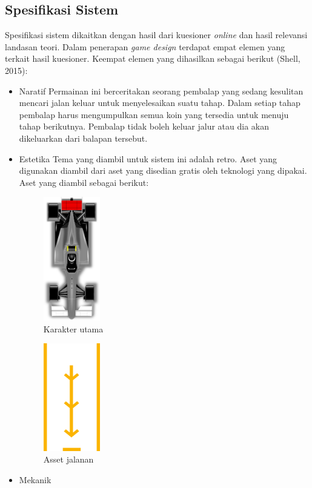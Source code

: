 	\subsection{Spesifikasi Sistem}
		Spesifikasi sistem dikaitkan dengan hasil dari kuesioner \textit{online} dan hasil relevansi landasan teori. Dalam penerapan \textit{game design} terdapat empat elemen yang terkait hasil kuesioner. Keempat elemen yang dihasilkan sebagai berikut (Shell, 2015):
		\begin{itemize}
			\item Naratif
				\subitem Permainan ini berceritakan seorang pembalap yang sedang kesulitan mencari jalan keluar untuk menyelesaikan suatu tahap. Dalam setiap tahap pembalap harus mengumpulkan semua koin yang tersedia untuk menuju tahap berikutnya. Pembalap tidak boleh keluar jalur atau dia akan dikeluarkan dari balapan tersebut.
			\item Estetika
				\subitem Tema yang diambil untuk sistem ini adalah retro. Aset yang digunakan diambil dari aset yang disedian gratis oleh teknologi yang dipakai. Aset yang diambil sebagai berikut:
				\begin{figure}
					\centering
					\includegraphics[width=70pt]{pics/aset/1}
					\caption{Karakter utama}
				\end{figure}
				\begin{figure}
					\centering
					\includegraphics[width=70pt]{pics/aset/2}
					\caption{Asset jalanan}
				\end{figure}
			\item Mekanik

\end{itemize}
